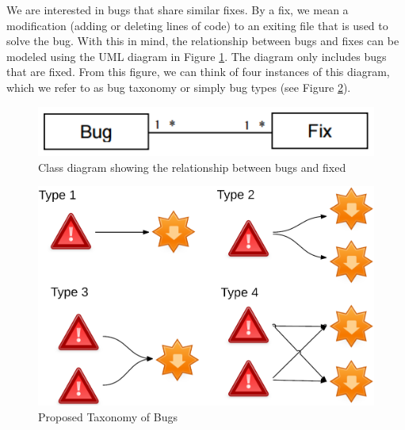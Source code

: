 We are interested in bugs that share similar fixes.
By a fix, we mean a modification (adding or deleting lines of
code) to an exiting file that is used to solve the bug. With this
in mind, the relationship between bugs and fixes can be
modeled using the UML diagram in Figure \ref{fig:bug-taxo-diag}. The diagram
only includes bugs that are fixed. From this figure, we can
think of four instances of this diagram, which we refer to as
bug taxonomy or simply bug types (see Figure \ref{fig:bug-taxo}).



\begin{figure}[h!]
  \centering
    \includegraphics[scale=0.5]{media/bug-taxo-class-diag.png}
    \caption{Class diagram showing the relationship between bugs and fixed
    \label{fig:bug-taxo-diag}}
\end{figure}


\begin{figure}[h!]
  \centering
    \includegraphics[scale=0.6]{media/bug-taxo.png}
    \caption{Proposed Taxonomy of Bugs
    \label{fig:bug-taxo}}
\end{figure}


